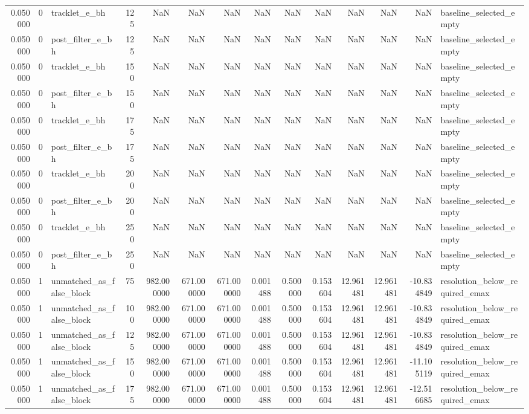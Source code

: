\begin{tabular}{rrlrrrrrrrrrrl}
0.050000 & 0 & tracklet_e_bh & 125 & NaN & NaN & NaN & NaN & NaN & NaN & NaN & NaN & NaN & baseline_selected_empty \\
0.050000 & 0 & post_filter_e_bh & 125 & NaN & NaN & NaN & NaN & NaN & NaN & NaN & NaN & NaN & baseline_selected_empty \\
0.050000 & 0 & tracklet_e_bh & 150 & NaN & NaN & NaN & NaN & NaN & NaN & NaN & NaN & NaN & baseline_selected_empty \\
0.050000 & 0 & post_filter_e_bh & 150 & NaN & NaN & NaN & NaN & NaN & NaN & NaN & NaN & NaN & baseline_selected_empty \\
0.050000 & 0 & tracklet_e_bh & 175 & NaN & NaN & NaN & NaN & NaN & NaN & NaN & NaN & NaN & baseline_selected_empty \\
0.050000 & 0 & post_filter_e_bh & 175 & NaN & NaN & NaN & NaN & NaN & NaN & NaN & NaN & NaN & baseline_selected_empty \\
0.050000 & 0 & tracklet_e_bh & 200 & NaN & NaN & NaN & NaN & NaN & NaN & NaN & NaN & NaN & baseline_selected_empty \\
0.050000 & 0 & post_filter_e_bh & 200 & NaN & NaN & NaN & NaN & NaN & NaN & NaN & NaN & NaN & baseline_selected_empty \\
0.050000 & 0 & tracklet_e_bh & 250 & NaN & NaN & NaN & NaN & NaN & NaN & NaN & NaN & NaN & baseline_selected_empty \\
0.050000 & 0 & post_filter_e_bh & 250 & NaN & NaN & NaN & NaN & NaN & NaN & NaN & NaN & NaN & baseline_selected_empty \\
0.050000 & 1 & unmatched_as_false_block & 75 & 982.000000 & 671.000000 & 671.000000 & 0.001488 & 0.500000 & 0.153604 & 12.961481 & 12.961481 & -10.834849 & resolution_below_required_emax \\
0.050000 & 1 & unmatched_as_false_block & 100 & 982.000000 & 671.000000 & 671.000000 & 0.001488 & 0.500000 & 0.153604 & 12.961481 & 12.961481 & -10.834849 & resolution_below_required_emax \\
0.050000 & 1 & unmatched_as_false_block & 125 & 982.000000 & 671.000000 & 671.000000 & 0.001488 & 0.500000 & 0.153604 & 12.961481 & 12.961481 & -10.834849 & resolution_below_required_emax \\
0.050000 & 1 & unmatched_as_false_block & 150 & 982.000000 & 671.000000 & 671.000000 & 0.001488 & 0.500000 & 0.153604 & 12.961481 & 12.961481 & -11.105119 & resolution_below_required_emax \\
0.050000 & 1 & unmatched_as_false_block & 175 & 982.000000 & 671.000000 & 671.000000 & 0.001488 & 0.500000 & 0.153604 & 12.961481 & 12.961481 & -12.516685 & resolution_below_required_emax \\

\end{tabular}
